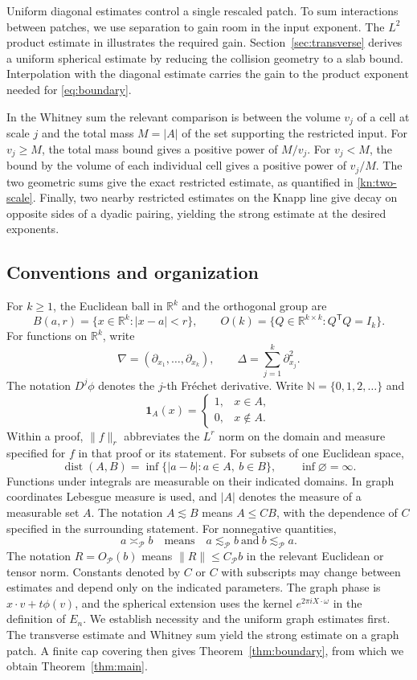 \documentclass[11pt]{article}
\numberwithin{equation}{section}
\newcommand{\R}{\mathbb{R}}
\newcommand{\N}{\mathbb{N}}
\newcommand{\norm}[1]{\lVert #1\rVert}
\newcommand{\abs}[1]{\lvert #1\rvert}
\newcommand{\dist}{\operatorname{dist}}
\begin{document}
Uniform diagonal estimates control a single rescaled patch. To sum
interactions between patches, we use separation to gain room in the
input exponent. The \(L^2\) product estimate in
\cite[Theorem~2.3]{TVV} illustrates the required gain.
Section~\ref{sec:transverse} derives a uniform spherical estimate by
reducing the collision geometry to a slab bound. Interpolation with
the diagonal estimate carries the gain to the product exponent needed
for \eqref{eq:boundary}.

In the Whitney sum the relevant comparison is between the volume
\(v_j\) of a cell at scale \(j\) and the total mass \(M=\abs A\) of
the set supporting the restricted input. For \(v_j\ge M\), the
total mass bound gives a positive power of \(M/v_j\). For \(v_j<M\),
the bound by the volume of each individual cell gives a positive
power of \(v_j/M\). The two geometric sums give the exact restricted
estimate, as quantified in \eqref{kn:two-scale}. Finally, two nearby
restricted estimates on the Knapp line give decay on opposite sides
of a dyadic pairing, yielding the strong estimate at the desired
exponents.

\subsection*{Conventions and organization}

For \(k\ge1\), the Euclidean ball in \(\R^k\) and the orthogonal group are
\[
 B(a,r)=\{x\in\R^k:|x-a|<r\},\qquad
 O(k)=\{Q\in\R^{k\times k}:Q^{\mathsf T}Q=I_k\}.
\]
For functions on \(\R^k\), write
\[
 \nabla=(\partial_{x_1},\ldots,\partial_{x_k}),\qquad
 \Delta=\sum_{j=1}^k\partial_{x_j}^2.
\]
The notation \(D^j\phi\) denotes the \(j\)-th Fr\'echet derivative.
Write \(\N=\{0,1,2,\ldots\}\) and
\[
 \mathbf1_A(x)=
 \begin{cases}1,&x\in A,\\0,&x\notin A.\end{cases}
\]
Within a proof, \(\norm f_r\) abbreviates the \(L^r\) norm on the
domain and measure specified for \(f\) in that proof or its statement.
For subsets of one Euclidean space,
\[
 \dist(A,B)=\inf\{|a-b|:a\in A,\ b\in B\},\qquad \inf\varnothing=\infty.
\]
Functions under integrals are measurable on their indicated domains.
In graph coordinates Lebesgue measure is used, and \(|A|\) denotes
the measure of a measurable set \(A\). The notation $A\lesssim B$ means $A\leq C B$,
with the dependence of $C$ specified in the surrounding statement.
For nonnegative quantities,
\[
 a\asymp_{\mathcal P}b
 \quad\text{means}\quad
 a\lesssim_{\mathcal P}b\ \text{and}\ b\lesssim_{\mathcal P}a.
\]
The notation \(R=O_{\mathcal P}(b)\) means
\(\norm R\le C_{\mathcal P}b\) in the relevant Euclidean or tensor norm.
Constants denoted by $C$ or $C$ with subscripts may change between
estimates and depend only on the indicated parameters.
The graph phase is $x\cdot v+t\phi(v)$, and the spherical extension
uses the kernel \(e^{2\pi iX\cdot\omega}\) in the definition of \(E_n\).
We establish necessity and the
uniform graph estimates first. The transverse estimate and Whitney
sum yield the strong estimate on a graph patch. A finite cap covering
then gives Theorem~\ref{thm:boundary}, from which we obtain
Theorem~\ref{thm:main}.
\end{document}
